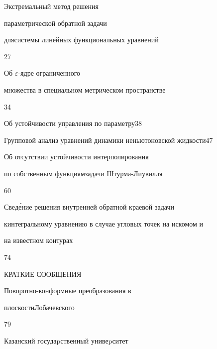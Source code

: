 {Экстремальный метод решения


параметрической обратной задачи


для\newline системы линейных функциональных уравнений}{27}




{Об $\varepsilon$-ядре ограниченного


множества в специальном метрическом пространстве}{34}




{ Об устойчивости управления по параметру}{38}




{Групповой анализ уравнений динамики неньютоновской жидкости}{47}




{Об отсутствии устойчивости интерполирования


по собственным функциям\newline задачи Штурма-Лиувилля}{60}




{Свед\'ение решения внутренней обратной краевой задачи


к\newline интегральному уравнению в случае угловых точек на искомом и


на известном контурах}{74}





\bigskip


{\centerline {КРАТКИЕ СООБЩЕНИЯ}}


\bigskip







{Поворотно-конформные преобразования в  


плоскости\newline Лобачевского}{79}








\vfill


\noindent\raisebox{2pt}{\copyright} Казанский госудаpственный унивеpситет





